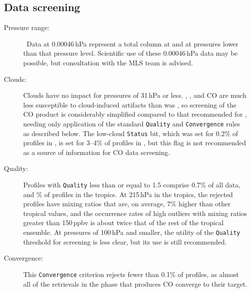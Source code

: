 \begin{nofloatpages}
\subsection{Data screening}
\label{sec:COScreening}
\begin{description}
  \item[Pressure range:]  \standardrangestatement\ Data at 0.00046\,hPa represent a total column at and at pressures lower than that pressure level. Scientific use of these 0.00046\,hPa data may be possible, but consultation with the MLS team is advised. \standardprecisionrule \evenstatusrule

  \item[Clouds:] Clouds have no impact for pressures of 31\,hPa or less. \thisv, \prevv, and \viv CO are much less susceptible to cloud-induced artifacts than was \viii, so screening of the CO product is considerably simplified compared to that recommended for \viii, needing only application of the standard \texttt{Quality} and \texttt{Convergence} rules as described below. The low-cloud \texttt{Status} bit, which was set for 0.2\% of profiles in \prevv, is set for 3--4\% of profiles in \thisv, but this flag is not recommended as a source of information for CO data screening.  

  \item[Quality:]  Profiles with \texttt{Quality} less than or equal to 1.5 comprise 0.7\% of all data, and \% of profiles in the tropics. At 215\,hPa in the tropics, the rejected profiles have mixing ratios that are, on average, 7\% higher than other tropical values, and the occurrence rates of high outliers with mixing ratios greater than 150\,ppbv is about twice that of the rest of the tropical ensemble. At pressures of 100\,hPa and smaller, the utility of the \texttt{Quality} threshold for screening is less clear, but its use is still recommended. 

  \item[Convergence:]  This \texttt{Convergence} criterion rejects fewer than 0.1\% of profiles, as almost all of the retrievals in the phase that produces \thisv CO converge to their target.
\end{description}
\end{nofloatpages}

